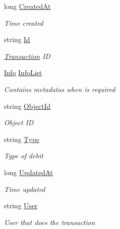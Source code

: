 \begin{DoxyCompactItemize}
long \hyperlink{class_giift_a_p_i_c_sharp_1_1_transaction_af5a47856df75a3c308c445cb89b5ec51}{Created\+At}
\begin{DoxyCompactList}\small\item\em Time created \end{DoxyCompactList}\item 
string \hyperlink{class_giift_a_p_i_c_sharp_1_1_transaction_ada43ad198ef6b85c9b09bf2ce3ffed4a}{Id}
\begin{DoxyCompactList}\small\item\em \hyperlink{class_giift_a_p_i_c_sharp_1_1_transaction}{Transaction} ID \end{DoxyCompactList}\item 
\hyperlink{class_giift_a_p_i_c_sharp_1_1_info}{Info} \hyperlink{class_giift_a_p_i_c_sharp_1_1_transaction_ae80396ed1f24b09adfc8cb1b11db5ec8}{Info\+List}
\begin{DoxyCompactList}\small\item\em Contains metadatas when is required \end{DoxyCompactList}\item 
string \hyperlink{class_giift_a_p_i_c_sharp_1_1_transaction_a989f4c68c527b0997e228423da831da5}{Object\+Id}
\begin{DoxyCompactList}\small\item\em Object ID \end{DoxyCompactList}\item 
string \hyperlink{class_giift_a_p_i_c_sharp_1_1_transaction_ae3ba42a67498852379c6b6b442ae17a0}{Type}
\begin{DoxyCompactList}\small\item\em Type of debit \end{DoxyCompactList}\item 
long \hyperlink{class_giift_a_p_i_c_sharp_1_1_transaction_aeb84a7078db73defdad4610e7740d410}{Updated\+At}
\begin{DoxyCompactList}\small\item\em Time updated \end{DoxyCompactList}\item 
string \hyperlink{class_giift_a_p_i_c_sharp_1_1_transaction_aea99411ecc4ac21adea46d50297e74ec}{User}
\begin{DoxyCompactList}\small\item\em User that does the transaction \end{DoxyCompactList}\end{DoxyCompactItemize}


